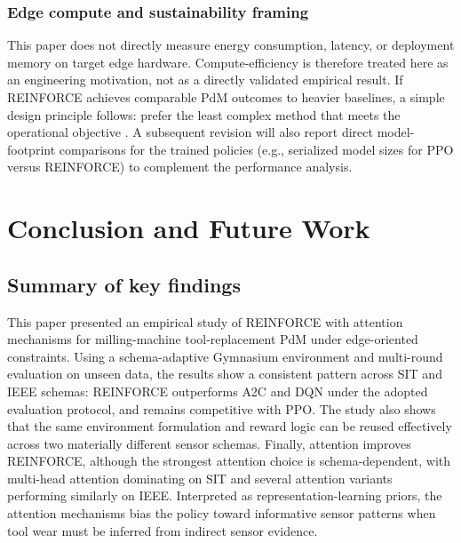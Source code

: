 \documentclass[sn-basic]{sn-jnl} %
\begin{document}
\subsubsection{Edge compute and sustainability framing}
This paper does not directly measure energy consumption, latency, or deployment memory on target edge hardware. Compute-efficiency is therefore treated here as an engineering motivation, not as a directly validated empirical result. If \textsc{REINFORCE} achieves comparable PdM outcomes to heavier baselines, a simple design principle follows: prefer the least complex method that meets the operational objective \cite{Schwartz2020, Strubell2019}. A subsequent revision will also report direct model-footprint comparisons for the trained policies (e.g., serialized model sizes for PPO versus \textsc{REINFORCE}) to complement the performance analysis.

\section{Conclusion and Future Work}
\label{sec:conclusion}
\subsection{Summary of key findings}
This paper presented an empirical study of \textsc{REINFORCE} with attention mechanisms for milling-machine tool-replacement PdM under edge-oriented constraints. Using a schema-adaptive Gymnasium environment and multi-round evaluation on unseen data, the results show a consistent pattern across SIT and IEEE schemas: \textsc{REINFORCE} outperforms \textsc{A2C} and \textsc{DQN} under the adopted evaluation protocol, and remains competitive with \textsc{PPO}. The study also shows that the same environment formulation and reward logic can be reused effectively across two materially different sensor schemas. Finally, attention improves \textsc{REINFORCE}, although the strongest attention choice is schema-dependent, with multi-head attention dominating on SIT and several attention variants performing similarly on IEEE. Interpreted as representation-learning priors, the attention mechanisms bias the policy toward informative sensor patterns when tool wear must be inferred from indirect sensor evidence.
\end{document}
